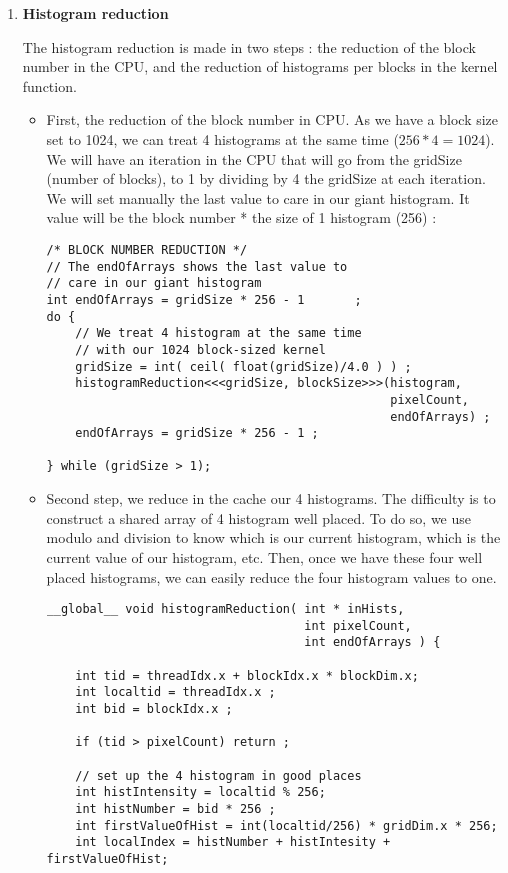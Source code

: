 \documentclass{article}
\begin{document}
\begin{enumerate}
    \item \textbf{Histogram reduction}
    
    The histogram reduction is made in two steps : the reduction of the block number in the CPU, and the reduction of histograms per blocks in the kernel function. 
    
    \begin{itemize}
        \item First, the reduction of the block number in CPU. As we have a block size set to 1024, we can treat 4 histograms at the same time ($256 * 4 = 1024$). We will have an iteration in the CPU that will go from the gridSize (number of blocks), to 1 by dividing by 4 the gridSize at each iteration. We will set manually the last value to care in our giant histogram. It value will be the block number * the size of 1 histogram (256) : 
    \begin{verbatim}
/* BLOCK NUMBER REDUCTION */
// The endOfArrays shows the last value to 
// care in our giant histogram
int endOfArrays = gridSize * 256 - 1	   ;
do {
    // We treat 4 histogram at the same time 
    // with our 1024 block-sized kernel
    gridSize = int( ceil( float(gridSize)/4.0 ) ) ;
    histogramReduction<<<gridSize, blockSize>>>(histogram, 
                                                pixelCount, 
                                                endOfArrays) ;
    endOfArrays = gridSize * 256 - 1 ;
	
} while (gridSize > 1);
    \end{verbatim}
    
        \item  Second step, we reduce in the cache our 4 histograms. The difficulty is to construct a shared array of 4 histogram well placed. To do so, we use modulo and division to know which is our current histogram, which is the current value of our histogram, etc.
        Then, once we have these four well placed histograms, we can easily reduce the four histogram values to one.
    
        \begin{verbatim}
__global__ void histogramReduction( int * inHists, 
                                    int pixelCount, 
                                    int endOfArrays ) {

    int tid = threadIdx.x + blockIdx.x * blockDim.x;	
    int localtid = threadIdx.x ;
    int bid = blockIdx.x ;
    
    if (tid > pixelCount) return ;
    
    // set up the 4 histogram in good places
    int histIntensity = localtid % 256;
    int histNumber = bid * 256 ; 
    int firstValueOfHist = int(localtid/256) * gridDim.x * 256;
    int localIndex = histNumber + histIntesity + firstValueOfHist; 
    

\end{verbatim}
\end{itemize}
\end{enumerate}
\end{document}
